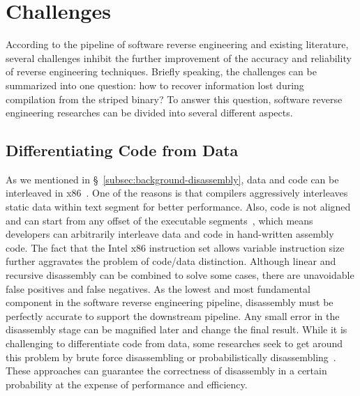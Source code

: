 \chapter{Challenges}\label{sec-challenges}

According to the pipeline of software reverse engineering and existing
literature, several challenges inhibit the further improvement of the accuracy
and reliability of reverse engineering techniques. Briefly speaking, the
challenges can be summarized into one question: how to recover information lost
during compilation from the striped binary? To answer this question, software
reverse engineering researches can be divided into several different aspects.

\section{Differentiating Code from Data} \label{sec:challenges-data-or-code}
As we mentioned in \S~\ref{subsec:background-disassembly}, data and code can be
interleaved in x86~\cite{caballero2016type}. One of the reasons is that
compilers aggressively interleaves static data within text segment for better
performance. Also, code is not aligned and can start from any offset of the
executable segments~\cite{bauman2018superset}, which means developers can
arbitrarily interleave data and code in hand-written assembly code. The fact
that the Intel x86 instruction set allows variable instruction size further
aggravates the problem of code/data distinction. Although linear and recursive
disassembly can be combined to solve some cases, there are unavoidable false
positives and false negatives. As the lowest and most fundamental component in
the software reverse engineering pipeline, disassembly must be perfectly
accurate to support the downstream pipeline. Any small error in the disassembly
stage can be magnified later and change the final result.
While it is challenging to differentiate code from data, some researches seek
to get around this problem by brute force disassembling or probabilistically
disassembling~\cite{bauman2018superset,miller2019probabilistic}. These
approaches can guarantee the correctness of disassembly in a certain
probability at the expense of performance and efficiency.

